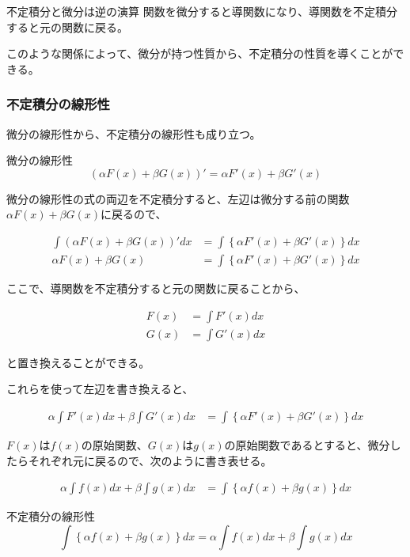 \documentclass[../math-imaging]{subfiles}
\begin{document}
\begin{theorem}{不定積分と微分は逆の演算}
  \newline
  関数を微分すると導関数になり、導関数を不定積分すると元の関数に戻る。
\end{theorem}

このような関係によって、微分が持つ性質から、不定積分の性質を導くことができる。

\subsubsection{不定積分の線形性}

微分の線形性から、不定積分の線形性も成り立つ。

\begin{review}
  微分の線形性
  \begin{equation}
    (\alpha F(x) + \beta G(x))' = \alpha F'(x) + \beta G'(x)
  \end{equation}
\end{review}

微分の線形性の式の両辺を不定積分すると、左辺は微分する前の関数$\alpha F(x) + \beta G(x)$に戻るので、

\begin{align}
  \int (\alpha F(x) + \beta G(x))' dx & = \int \left\{ \alpha F'(x) + \beta G'(x) \right\} dx \\
  \alpha F(x) + \beta G(x)            & = \int \left\{ \alpha F'(x) + \beta G'(x) \right\} dx
\end{align}

ここで、導関数を不定積分すると元の関数に戻ることから、

\begin{align}
  F(x) & = \int F'(x) dx \\
  G(x) & = \int G'(x) dx
\end{align}

と置き換えることができる。

これらを使って左辺を書き換えると、

\begin{align}
  \alpha \int F'(x) dx + \beta \int G'(x) dx & = \int \left\{ \alpha F'(x) + \beta G'(x) \right\} dx
\end{align}

$F(x)$は$f(x)$の原始関数、$G(x)$は$g(x)$の原始関数であるとすると、微分したらそれぞれ元に戻るので、次のように書き表せる。

\begin{align}
  \alpha \int f(x) dx + \beta \int g(x) dx & = \int \left\{ \alpha f(x) + \beta g(x) \right\} dx
\end{align}

\begin{theorem}{不定積分の線形性}
  \Large
  \begin{equation}
    \int \left\{ \alpha f(x) + \beta g(x) \right\} dx = \alpha \int f(x) dx + \beta \int g(x) dx
  \end{equation}
\end{theorem}
\end{document}
